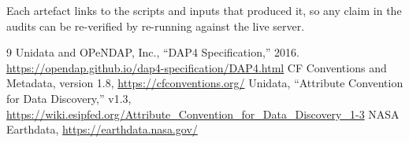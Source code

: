 \documentclass[11pt]{article}
\begin{document}
Each artefact links to the scripts and inputs that produced it,
so any claim in the audits can be re-verified by re-running
against the live server.

\begin{thebibliography}{9}
 Unidata and OPeNDAP, Inc., ``DAP4 Specification,''
  2016. \url{https://opendap.github.io/dap4-specification/DAP4.html}
 CF Conventions and Metadata, version 1.8,
  \url{https://cfconventions.org/}
 Unidata, ``Attribute Convention for Data
  Discovery,'' v1.3,
  \url{https://wiki.esipfed.org/Attribute_Convention_for_Data_Discovery_1-3}
 NASA Earthdata,
  \url{https://earthdata.nasa.gov/}
\end{thebibliography}
\end{document}
